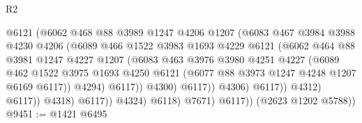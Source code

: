 \begin{lexlean}{R2}
\begin{coremodule}
                                    @6121
                                    (@6062
                                      @468
                                      @88
                                      @3989
                                      @1247
                                      @4206
                                      @1207
                                      (@6083
                                        @467
                                        @3984
                                        @3988
                                        @4230
                                        @4206
                                        (@6089
                                          @466
                                          @1522
                                          @3983
                                          @1693
                                          @4229
                                          @6121
                                          (@6062
                                            @464
                                            @88
                                            @3981
                                            @1247
                                            @4227
                                            @1207
                                            (@6083
                                              @463
                                              @3976
                                              @3980
                                              @4251
                                              @4227
                                              (@6089
                                                @462
                                                @1522
                                                @3975
                                                @1693
                                                @4250
                                                @6121
                                                (@6077 @88 @3973 @1247 @4248 @1207 @6169 @6117))
                                              @4294)
                                            @6117))
                                        @4300)
                                      @6117))
                                  @4306)
                                @6117))
                            @4312)
                          @6117))
                      @4318)
                    @6117))
                @4324)
              @6118)
            @7671)
          @6117))
      (@2623 @1202 @5788))
@9451 := @1421 @6495

\end{coremodule}
\end{lexlean}
